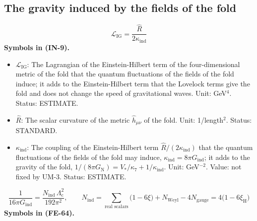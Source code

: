 \documentclass[
  10pt,
]{article}
\providecommand{\tightlist}{%
  \setlength{\itemsep}{0pt}\setlength{\parskip}{0pt}}
\begin{document}
\hypertarget{the-gravity-induced-by-the-fields-of-the-fold}{%
\subsection{The gravity induced by the fields of the
fold}\label{the-gravity-induced-by-the-fields-of-the-fold}}

\[
\mathcal{L}_{\mathrm{IG}} = \frac{\hat R}{2\kappa_{\mathrm{ind}}} \tag{IN-9}
\] \textbf{Symbols in (IN-9).}

\begin{itemize}
\tightlist
\item
  \(\mathcal{L}_{\mathrm{IG}}\): The Lagrangian of the Einstein-Hilbert
  term of the four-dimensional metric of the fold that the quantum
  fluctuations of the fields of the fold induce; it adds to the
  Einstein-Hilbert term that the Lovelock terms give the fold and does
  not change the speed of gravitational waves. Unit: GeV\(^4\). Status:
  ESTIMATE.
\item
  \(\hat R\): The scalar curvature of the metric \(\hat h_{\mu\nu}\) of
  the fold. Unit: 1/length\(^2\). Status: STANDARD.
\item
  \(\kappa_{\mathrm{ind}}\): The coupling of the Einstein-Hilbert term
  \(\hat R/(2\kappa_{\mathrm{ind}})\) that the quantum fluctuations of
  the fields of the fold may induce,
  \(\kappa_{\mathrm{ind}} = 8\pi G_{\mathrm{ind}}\); it adds to the
  gravity of the fold,
  \(1/(8\pi G_{\mathrm{N}}) = V_*/\kappa_7 + 1/\kappa_{\mathrm{ind}}\).
  Unit: GeV\(^{-2}\). Value: not fixed by UM-3. Status: ESTIMATE.
\end{itemize}

\[
\frac{1}{16\pi G_{\mathrm{ind}}} = \frac{N_{\mathrm{ind}}\,\Lambda_{\mathrm{c}}^2}{192\pi^2},\qquad
N_{\mathrm{ind}} = \sum_{\text{real scalars}}\big(1 - 6\xi\big) + N_{\mathrm{Weyl}} - 4N_{\mathrm{gauge}} = 4\big(1 - 6\xi_{\mathrm{H}}\big) \tag{FE-64}
\] \textbf{Symbols in (FE-64).}
\end{document}
